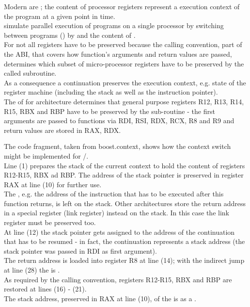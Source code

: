 \label{mechanism}

Modern  are ; the content of
processor registers represent a execution context of the program at a given
point in time.\\
 simulate parallel execution of programs on a single
processor by switching between programs () by
 and  the content of .\\

For \cc not all registers have to be preserved because the calling convention,
part of the ABI, that covers how function's arguments and return values are
passed, determines which subset of micro-processor registers have to be
preserved by the called subroutine.\\

As a consequence a continuation preserves the execution context, e.g. state of
the register machine (including the stack as well as the instruction pointer).\\

The \cite{SYSVABI} of  for 
architecture determines that general purpose registers R12, R13, R14, R15, RBX
and RBP have to be preserved by the sub-routine - the first arguments are passed
to functions via RDI, RSI, RDX, RCX, R8 and R9 and return values are stored in
RAX, RDX.\\


The code fragment, taken from boost.context\cite{bcontext}, shows how the
context switch might be implemented for /.\\
Line (1) prepares the stack of the current context to hold the content of
registers R12-R15, RBX ad RBP. The address of the stack pointer is preserved in
register RAX at line (10) for further use.\\
The , e.g. the address of the instruction that has to be
executed after this function returns, is left on the stack. Other architectures
store the return address in a special register (link register) instead on the
stack. In this case the link register must be preserved too.\\
At line (12) the stack pointer gets assigned to the address of the
continuation that has to be resumed - in fact, the continuation represents a
stack address (the stack pointer was passed in RDI as first argument).\\
The return address is loaded into register R8 at line (14); with the indirect
jump at line (28) the  is .\\
As required by the calling convention, registers R12-R15, RBX and RBP are
restored at lines (16) - (21).\\
The stack address, preserved in RAX at line (10), of the
 is  as a .\\

